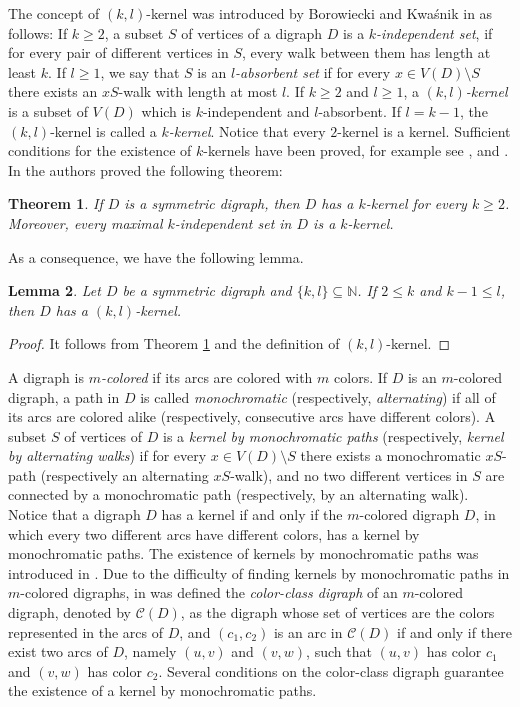 \documentclass[10pt,a4paper]{article}
\newtheorem{theorem}{Theorem}[section]
\newtheorem{lemma}[theorem]{Lemma}
\begin{document}
The concept of $(k,l)$-kernel was introduced by Borowiecki and Kwa\'snik in \cite{14} as follows:
If $k \geq 2$, a subset $S$ of vertices of a digraph $D$ is a \emph{$k$-independent set}, if for every pair of different vertices in $S$, every walk between them has length at least $k$. If $l \geq 1$, we say that $S$ is an \emph{$l$-absorbent set} if for every $x \in V(D) \setminus S$ there exists an $xS$-walk with length at most $l$.
If $k \geq 2$ and $l \geq 1 $, a \emph{$(k,l)$-kernel} is a subset of $V(D)$ which is $k$-independent and $l$-absorbent. If $l=k-1$, the $(k,l)$-kernel is called a \emph{$k$-kernel}. Notice that every $2$-kernel is a kernel. Sufficient conditions for the existence of $k$-kernels have been proved, for example see \cite{symmetricdigraphs}, \cite{6} and \cite{5}. In \cite{symmetricdigraphs} the authors proved the following theorem:
  
\begin{theorem}\cite{symmetricdigraphs}
\label{c0.t1}
If $D$ is a symmetric digraph, then $D$ has a $k$-kernel for every $k \geq 2$. Moreover, every maximal $k$-independent set in $D$ is a $k$-kernel.
\end{theorem}

As a consequence, we have the following lemma.

\begin{lemma}
\label{symetricklkernel} Let $D$ be a symmetric digraph and $\{k, l \} \subseteq \mathbb{N}$. If $2 \leq k $ and $k-1 \leq l$, then $D$ has a $(k,l)$-kernel.
\end{lemma}
\begin{proof}
It follows from Theorem \ref{c0.t1} and the definition of $(k,l)$-kernel.
\end{proof}

A digraph is \emph{$m$-colored} if its arcs are colored with $m$ colors. If $D$ is an $m$-colored digraph, a path in $D$ is called \emph{monochromatic} (respectively, \emph{alternating}) if all of its arcs are colored alike (respectively, consecutive arcs have different colors). 
A subset $S$ of vertices of $D$ is a \emph{kernel by monochromatic paths} (respectively, \emph{kernel by alternating walks}) if for every $x \in V(D) \setminus S$ there exists a monochromatic $xS$-path (respectively an alternating $xS$-walk), and no two different vertices in $S$ are connected by a monochromatic path (respectively, by an alternating walk). 
Notice that a digraph $D$ has a kernel if and only if the $m$-colored digraph $D$, in which every two different arcs have different colors, has a kernel by monochromatic paths. 
The existence of kernels by monochromatic paths was introduced in \cite{9}. 
Due to the difficulty of finding kernels by monochromatic paths in $m$-colored digraphs, in \cite{11} was defined the \emph{color-class digraph} of an $m$-colored digraph, denoted by $\mathscr{C}(D)$, as the digraph whose set of vertices are the colors represented in the arcs of $D$, and $(c_{1}, c_{2})$ is an arc in $\mathscr{C}(D)$ if and only if there exist two arcs of $D$, namely $(u,v)$ and $(v,w)$, such that $(u,v)$ has color $c_{1}$ and $(v,w)$ has color $c_{2}$. Several conditions on the color-class digraph guarantee the existence of a kernel by monochromatic paths.
\end{document}
